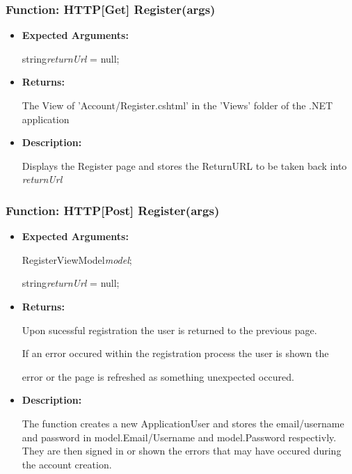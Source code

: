 \documentclass{scrreprt}
\begin{document}
\subsubsection{Function: HTTP[Get] Register(args)}

\begin{itemize}
        \item \textbf{Expected Arguments:}

                string\quad\textit{returnUrl} = null;

        \item \textbf{Returns:}

                The View of 'Account/Register.cshtml' in the 'Views' folder of the .NET
                application

        \item \textbf{Description:}

                Displays the Register page and stores the ReturnURL to be taken back into
                \textit{returnUrl}
\end{itemize}


\subsubsection{Function: HTTP[Post] Register(args)}

\begin{itemize}
        \item \textbf{Expected Arguments:}

                RegisterViewModel\quad\textit{model};

                string\quad\textit{returnUrl} = null;

        \item \textbf{Returns:}

                Upon sucessful registration the user is returned to the
                previous page.

                If an error occured within the registration process the user is
                shown the

                error or the page is refreshed as something unexpected occured.

        \item \textbf{Description:}

                The function creates a new ApplicationUser and stores the
                email/username and password in model.Email/Username and
                model.Password respectivly. They are then signed in or shown
                the errors that may have occured during the account creation.
\end{itemize}
\end{document}
